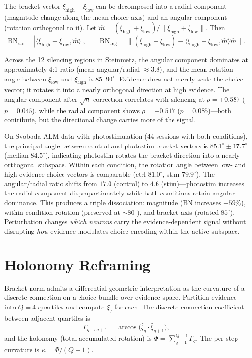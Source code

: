 \documentclass[9pt,lineno]{elife}
\begin{document}
The bracket vector $\xi_{\text{high}} - \xi_{\text{low}}$ can be decomposed into a radial component (magnitude change along the mean choice axis) and an angular component (rotation orthogonal to it). Let $\hat{m} = (\xi_{\text{high}} + \xi_{\text{low}}) / \lVert \xi_{\text{high}} + \xi_{\text{low}} \rVert$. Then
\[
\text{BN}_{\text{rad}} = |\langle \xi_{\text{high}} - \xi_{\text{low}}, \hat{m} \rangle|, \qquad
\text{BN}_{\text{ang}} = \lVert (\xi_{\text{high}} - \xi_{\text{low}}) - \langle \xi_{\text{high}} - \xi_{\text{low}}, \hat{m} \rangle \hat{m} \rVert .
\]

Across the 12 silencing regions in Steinmetz, the angular component dominates at approximately 4:1 ratio (mean angular/radial $\approx 3.8$), and the mean rotation angle between $\xi_{\text{low}}$ and $\xi_{\text{high}}$ is $85$--$90^\circ$. Evidence does not merely scale the choice vector; it rotates it into a nearly orthogonal direction at high evidence. The angular component after $\sqrt{n}$ correction correlates with silencing at $\rho = +0.587$ ($p = 0.045$), while the radial component shows $\rho = +0.517$ ($p = 0.085$)---both contribute, but the directional change carries more of the signal.

On Svoboda ALM data with photostimulation \citep{dandi000007, dandi000009} (44 sessions with both conditions), the principal angle between control and photostim bracket vectors is $85.1^\circ \pm 17.7^\circ$ (median $84.5^\circ$), indicating photostim rotates the bracket direction into a nearly orthogonal subspace. Within each condition, the rotation angle between low- and high-evidence choice vectors is comparable (ctrl $81.0^\circ$, stim $79.9^\circ$). The angular/radial ratio shifts from $17.0$ (control) to $4.6$ (stim)---photostim increases the radial component disproportionately while both conditions retain angular dominance. This produces a triple dissociation: magnitude (BN increases $+59\%$), within-condition rotation (preserved at ${\sim}80^\circ$), and bracket axis (rotated $85^\circ$). Perturbation changes \emph{which neurons} carry the evidence-dependent signal without disrupting \emph{how} evidence modulates choice encoding within the active subspace.

\section{Holonomy Reframing}
\label{app:holonomy}

Bracket norm admits a differential-geometric interpretation as the curvature of a discrete connection on a choice bundle over evidence space. Partition evidence into $Q = 4$ quartiles and compute $\xi_q$ for each. The discrete connection coefficient between adjacent quartiles is
\[
\Gamma_{q \to q+1} = \arccos\!\bigl(\hat{\xi}_q \cdot \hat{\xi}_{q+1}\bigr),
\]
and the holonomy (total accumulated rotation) is $\Phi = \sum_{q=1}^{Q-1} \Gamma_q$. The per-step curvature is $\kappa = \Phi / (Q - 1)$.
\end{document}
